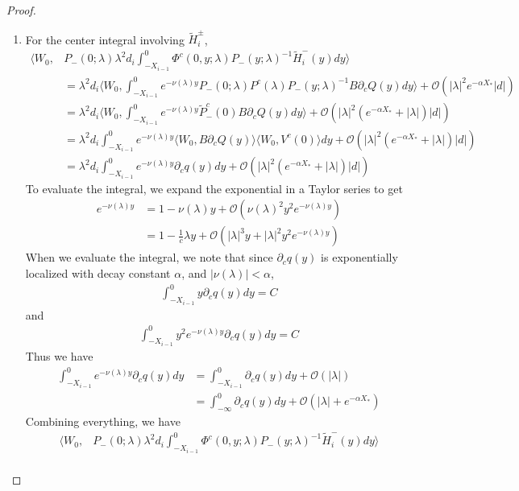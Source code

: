 \documentclass[thesis.tex]{subfiles}
\begin{document}
\begin{lemma}
\begin{proof}
\begin{enumerate}
\item For the center integral involving $\tilde{H}_i^\pm$, 
\begin{align*}
\langle W_0, &P_-(0; \lambda) \lambda^2 d_i \int_{-X_{i-1}}^0 \Phi^c(0, y; \lambda) P_-(y; \lambda)^{-1} \tilde{H}_i^-(y) dy \rangle \\
&= \lambda^2 d_i  \langle W_0, \int_{-X_{i-1}}^0 e^{-\nu(\lambda) y} P_-(0; \lambda) P^c(\lambda) P_-(y; \lambda)^{-1} B \partial_c Q(y) dy \rangle  + \mathcal{O}(|\lambda|^2 e^{-\alpha X_*} |d|) \\
&= \lambda^2 d_i  \langle W_0, \int_{-X_{i-1}}^0 e^{-\nu(\lambda) y} \tilde{P}^c_-(0) B \partial_c Q(y) dy \rangle + \mathcal{O}(|\lambda|^2( e^{-\alpha X_*} + |\lambda|) |d|)\\
&= \lambda^2 d_i  \int_{-X_{i-1}}^0 e^{-\nu(\lambda) y} \langle W_0, B \partial_c Q(y) \rangle \langle W_0, V^c(0) \rangle dy + \mathcal{O}(|\lambda|^2( e^{-\alpha X_*} + |\lambda|) |d|) \\
&= \lambda^2 d_i \int_{-X_{i-1}}^0 e^{-\nu(\lambda) y} \partial_c q(y) dy + \mathcal{O}(|\lambda|^2( e^{-\alpha X_*} + |\lambda|) |d|)
\end{align*}
To evaluate the integral, we expand the exponential in a Taylor series to get
\begin{align*}
e^{-\nu(\lambda)y} 
&= 1 - \nu(\lambda)y + \mathcal{O}( \nu(\lambda)^2 y^2 e^{-\nu(\lambda)y} ) \\
&= 1 - \frac{1}{c}\lambda y + \mathcal{O}(|\lambda|^3 y + |\lambda|^2 y^2 e^{-\nu(\lambda)y})
\end{align*}
When we evaluate the integral, we note that since $\partial_c q(y)$ is exponentially localized with decay constant $\alpha$, and $|\nu(\lambda)| < \alpha$,
\begin{align*}
\int_{-X_{i-1}}^0 y \partial_c q(y) dy = C
\end{align*}
and
\begin{align*}
\int_{-X_{i-1}}^0 y^2 e^{-\nu(\lambda)y}\partial_c q(y) dy = C
\end{align*}
Thus we have
\begin{align*}
\int_{-X_{i-1}}^0 e^{-\nu(\lambda) y} \partial_c q(y) dy &= \int_{-X_{i-1}}^0 \partial_c q(y)dy + \mathcal{O}(|\lambda|) \\
&= \int_{-\infty}^0 \partial_c q(y)dy + \mathcal{O}(|\lambda| + e^{-\alpha X_*}) 
\end{align*}
Combining everything, we have
\begin{align*}
\langle W_0, &P_-(0; \lambda) \lambda^2 d_i \int_{-X_{i-1}}^0 \Phi^c(0, y; \lambda) P_-(y; \lambda)^{-1} \tilde{H}_i^-(y) dy \rangle \\

\end{align*}
\end{enumerate}
\end{proof}
\end{lemma}
\end{document}
